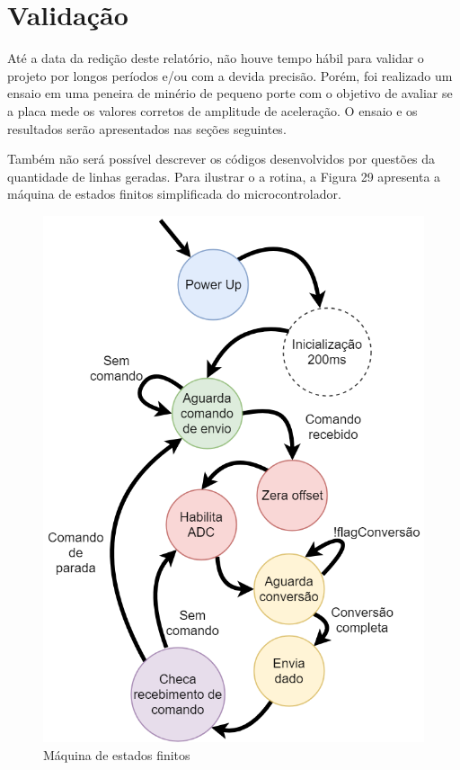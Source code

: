 \documentclass[11pt]{abntex2}
\begin{document}
		\chapter{Validação}
			Até a data da redição deste relatório, não houve tempo hábil para
			validar o projeto por longos períodos e/ou com a devida precisão.
			Porém, foi realizado um ensaio em uma peneira de minério de pequeno
			porte com o objetivo de avaliar se a placa mede os valores corretos
			de amplitude de aceleração. O ensaio e os resultados serão
			apresentados nas seções seguintes.

			Também não será possível descrever os códigos desenvolvidos por
			questões da quantidade de linhas geradas. Para ilustrar o a rotina,
			a Figura 29 apresenta a máquina de estados finitos simplificada do
			microcontrolador.

			\begin{figure}[!ht]
				\centering
				\includegraphics[scale = .47]{../Fotos/diagramaTelemetria.png}
				\caption{Máquina de estados finitos}
			\end{figure}
\end{document}
